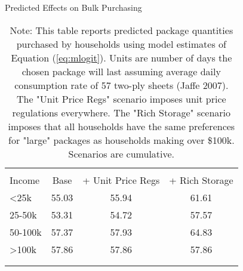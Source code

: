 \begin{table}[!htbp] \centering
\caption{Predicted Effects on Bulk Purchasing}
\label{tab:counterfactualMNLDays}
\begin{tabular}{lccc}
\\[-1.8ex]\hline
\hline \\[-1.8ex]
Income   & Base    & + Unit Price Regs   &  + Rich Storage  \\
\hline
<25k     & 55.03   & 55.94              & 61.61 \\
25-50k   & 53.31   & 54.72              & 57.57 \\
50-100k  & 57.37   & 57.93              & 64.83 \\
>100k    & 57.86   & 57.86              & 57.86 \\
\\[-1.8ex]\hline
\hline \\[-1.8ex]
\end{tabular}
\caption*{Note: This table reports predicted package quantities purchased by households using model estimates of Equation (\ref{eq:mlogit}). Units are number of days the chosen package will last assuming average daily consumption rate of 57 two-ply sheets (Jaffe 2007). The "Unit Price Regs" scenario imposes unit price regulations everywhere. The "Rich Storage" scenario imposes that all households have the same preferences for "large" packages as households making over \$100k. Scenarios are cumulative.}
\end{table}
